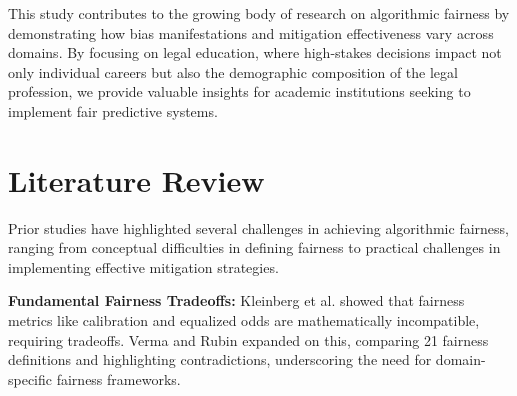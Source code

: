 \documentclass[10pt,journal,compsoc]{IEEEtran}
\begin{document}
This study contributes to the growing body of research on algorithmic fairness by demonstrating how bias manifestations and mitigation effectiveness vary across domains. By focusing on legal education, where high-stakes decisions impact not only individual careers but also the demographic composition of the legal profession, we provide valuable insights for academic institutions seeking to implement fair predictive systems.

\section{Literature Review}
Prior studies have highlighted several challenges in achieving algorithmic fairness, ranging from conceptual difficulties in defining fairness to practical challenges in implementing effective mitigation strategies.

\begin{table}[!t]
\caption{Summary of Key Literature on ML Fairness}
\label{table:literature}
\centering
{}
\end{table}

\textbf{Fundamental Fairness Tradeoffs:} Kleinberg et al.\cite{9} showed that fairness metrics like calibration and equalized odds are mathematically incompatible, requiring tradeoffs. Verma and Rubin\cite{13} expanded on this, comparing 21 fairness definitions and highlighting contradictions, underscoring the need for domain-specific fairness frameworks.
\end{document}
